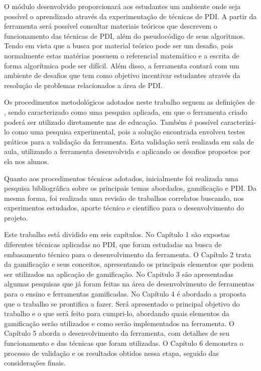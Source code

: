 \documentclass[
	12pt,				%
	oneside,			%
	a4paper,			%
	english,			%
	french,				%
	spanish,			%
	brazil,				%
	]{abntex2}
\begin{document}
O módulo desenvolvido proporcionará aos estudantes um ambiente onde seja possível o aprendizado através da experimentação de técnicas de PDI. A partir da ferramenta será possível consultar materiais teóricos que descrevem o funcionamento das técnicas de PDI, além do pseudocódigo de seus algoritmos. Tendo em vista que a busca por material teórico pode ser um desafio, pois normalmente estas matérias possuem o referencial matemático e a escrita de forma algorítmica pode ser difícil. Além disso, a ferramenta contará com um ambiente de desafios que tem como objetivo incentivar estudantes através da resolução de problemas relacionados a área de PDI.

Os procedimentos metodológicos adotados neste trabalho seguem as definições de
\cite{prodanov2013metodologia}, sendo caracterizado como uma pesquisa aplicada, em que o
ferramenta criado poderá ser utilizado diretamente nas de educação. Também é possível caracterizá-lo como uma pesquisa experimental, pois a solução encontrada envolveu testes práticos para a validação da ferramenta. Esta validação será realizada em sala de aula, utilizando a ferramenta desenvolvida e aplicando os desafios propostos por ela nos alunos.

Quanto aos procedimentos técnicos adotados, inicialmente foi realizada uma pesquisa
bibliográfica sobre os principais temas abordados, gamificação e PDI. Da mesma forma, foi realizada uma revisão de trabalhos correlatos buscando, nos experimentos estudados, aporte técnico e científico para o desenvolvimento do projeto.

Este trabalho está dividido em seis capítulos. No Capítulo 1 são expostas diferentes técnicas aplicadas no PDI, que foram estudadas na busca de embasamento técnico para o desenvolvimento da ferramenta. O Capítulo 2 trata da gamificação e seus conceitos, apresentando os principais elementos que podem ser utilizados na aplicação de gamificação. No Capitulo 3 são apresentadas algumas pesquisas que já foram feitas na área de desenvolvimento de ferramentas para o ensino e ferramentas gamificadas. No Capítulo 4 é abordado a proposta que o trabalho se prontifica a fazer. Será apresentado o principal objetivo do trabalho e o que será feito para cumpri-lo, abordando quais elementos da gamificação serão utilizados e como serão implementados na ferramenta. O Capítulo 5 aborda o desenvolvimento da ferramenta, com detalhes de seu funcionamento e das técnicas que foram utilizadas. O Capítulo 6 demonstra o processo de validação e os resultados obtidos nessa etapa, seguido das considerações finais.
\end{document}
